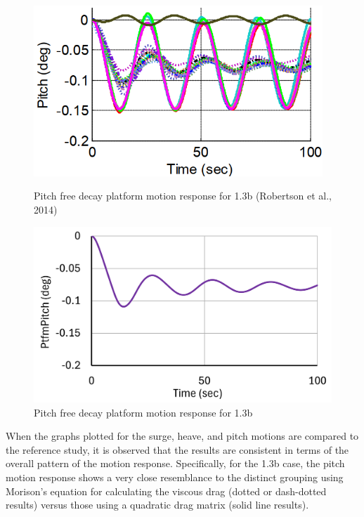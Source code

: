 \documentclass[a4paper, 11pt]{article}
\begin{document}
\begin{figure}[H]
    \begin{minipage}{0.47\textwidth}
        \centering
        \includegraphics[width=0.97\textwidth]{1.3b_pitch.png}
        \caption{\small Pitch free decay platform motion response for 1.3b (Robertson et al., 2014)}
        \label{fig:1.3b_pitch}
    \end{minipage}
    \hfill
    \begin{minipage}{0.5\textwidth}
        \centering
        \vspace{-0.3cm}
        \includegraphics[width=1\textwidth]{1.3b_pitch_mine.png}
        \caption{\small Pitch free decay platform motion response for 1.3b}
        \label{fig:1.3b_pitch_mine}
    \end{minipage}
\end{figure}

When the graphs plotted for the surge, heave, and pitch motions are compared to the reference study, it is observed that the results are consistent in terms of the overall pattern of the motion response. Specifically, for the 1.3b case, the pitch motion response shows a very close resemblance to the distinct grouping using Morison’s equation for calculating the viscous drag (dotted or dash-dotted results) versus those using a quadratic drag matrix (solid line results).
\end{document}
